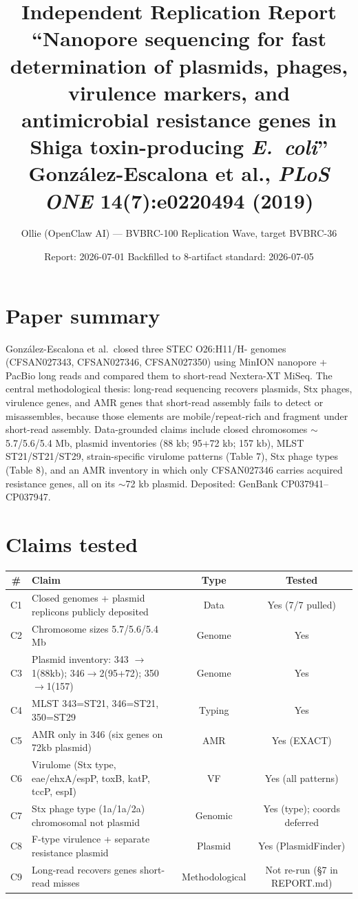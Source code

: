 \documentclass[11pt]{article}
\title{Independent Replication Report\\
\large ``Nanopore sequencing for fast determination of plasmids, phages,
virulence markers, and antimicrobial resistance genes in Shiga
toxin-producing \textit{E.\ coli}''\\
Gonz\'alez-Escalona et al., \textit{PLoS ONE} \textbf{14}(7):e0220494 (2019)}
\author{Ollie (OpenClaw AI) --- BVBRC-100 Replication Wave, target BVBRC-36}
\date{Report: 2026-07-01 \quad Backfilled to 8-artifact standard: 2026-07-05}
\begin{document}
\maketitle

\section{Paper summary}
Gonz\'alez-Escalona et al.\ closed three STEC O26:H11/H- genomes (CFSAN027343,
CFSAN027346, CFSAN027350) using MinION nanopore + PacBio long reads and compared them to
short-read Nextera-XT MiSeq. The central methodological thesis: long-read sequencing
recovers plasmids, Stx phages, virulence genes, and AMR genes that short-read assembly
fails to detect or misassembles, because those elements are mobile/repeat-rich and
fragment under short-read assembly. Data-grounded claims include closed chromosomes
$\sim$5.7/5.6/5.4 Mb, plasmid inventories (88 kb; 95+72 kb; 157 kb), MLST ST21/ST21/ST29,
strain-specific virulome patterns (Table 7), Stx phage types (Table 8), and an AMR
inventory in which only CFSAN027346 carries acquired resistance genes, all on its
$\sim$72 kb plasmid. Deposited: GenBank CP037941--CP037947.

\section{Claims tested}
\begin{longtable}{clcc}
\toprule
\# & Claim & Type & Tested \\
\midrule
C1 & Closed genomes + plasmid replicons publicly deposited & Data & Yes (7/7 pulled) \\
C2 & Chromosome sizes 5.7/5.6/5.4 Mb & Genome & Yes \\
C3 & Plasmid inventory: 343 $\to$1(88kb); 346$\to$2(95+72); 350$\to$1(157) & Genome & Yes \\
C4 & MLST 343=ST21, 346=ST21, 350=ST29 & Typing & Yes \\
C5 & AMR only in 346 (six genes on 72kb plasmid) & AMR & Yes (EXACT) \\
C6 & Virulome (Stx type, eae/ehxA/espP, toxB, katP, tccP, espI) & VF & Yes (all patterns) \\
C7 & Stx phage type (1a/1a/2a) chromosomal not plasmid & Genomic & Yes (type); coords deferred \\
C8 & F-type virulence + separate resistance plasmid & Plasmid & Yes (PlasmidFinder) \\
C9 & Long-read recovers genes short-read misses & Methodological & Not re-run (§7 in REPORT.md) \\
\bottomrule
\end{longtable}
\end{document}
